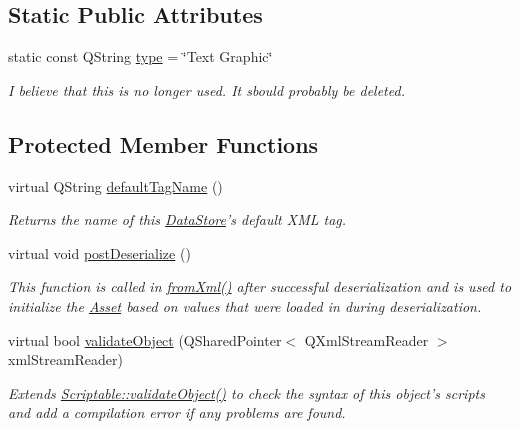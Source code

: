 \subsection*{Static Public Attributes}
\begin{DoxyCompactItemize}
\item 
\hypertarget{class_picto_1_1_text_graphic_a0302e1f96fb28a89be510c1feb9bc671}{static const Q\-String \hyperlink{class_picto_1_1_text_graphic_a0302e1f96fb28a89be510c1feb9bc671}{type} = \char`\"{}Text Graphic\char`\"{}}\label{class_picto_1_1_text_graphic_a0302e1f96fb28a89be510c1feb9bc671}

\begin{DoxyCompactList}\small\item\em I believe that this is no longer used. It sbould probably be deleted. \end{DoxyCompactList}\end{DoxyCompactItemize}
\subsection*{Protected Member Functions}
\begin{DoxyCompactItemize}
\item 
virtual Q\-String \hyperlink{class_picto_1_1_text_graphic_a8f558f2c47015b39817a7b9b29baf17f}{default\-Tag\-Name} ()
\begin{DoxyCompactList}\small\item\em Returns the name of this \hyperlink{class_picto_1_1_data_store}{Data\-Store}'s default X\-M\-L tag. \end{DoxyCompactList}\item 
virtual void \hyperlink{class_picto_1_1_text_graphic_a9489867ab4f18b66e16a21db5bfef5fb}{post\-Deserialize} ()
\begin{DoxyCompactList}\small\item\em This function is called in \hyperlink{class_picto_1_1_asset_a8bed4da09ecb1c07ce0dab313a9aba67}{from\-Xml()} after successful deserialization and is used to initialize the \hyperlink{class_picto_1_1_asset}{Asset} based on values that were loaded in during deserialization. \end{DoxyCompactList}\item 
\hypertarget{class_picto_1_1_text_graphic_aff3aa13a13b124b6e28a0b26cc8ad398}{virtual bool \hyperlink{class_picto_1_1_text_graphic_aff3aa13a13b124b6e28a0b26cc8ad398}{validate\-Object} (Q\-Shared\-Pointer$<$ Q\-Xml\-Stream\-Reader $>$ xml\-Stream\-Reader)}\label{class_picto_1_1_text_graphic_aff3aa13a13b124b6e28a0b26cc8ad398}

\begin{DoxyCompactList}\small\item\em Extends \hyperlink{class_picto_1_1_scriptable_ab6e2944c43a3b5d418bf7b251594386d}{Scriptable\-::validate\-Object()} to check the syntax of this object's scripts and add a compilation error if any problems are found. \end{DoxyCompactList}\end{DoxyCompactItemize}
